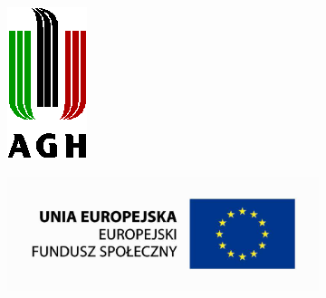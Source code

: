 \documentclass[9pt]{beamer}
\begin{document}
\begin{frame}
\begin{figure}[h!]
\begin{subfigure}[b]{0.06\textwidth}
		\includegraphics[width=\textwidth, keepaspectratio=true]{img/agh.png}
	\end{subfigure}
	\qquad
	\begin{subfigure}[b]{0.3\textwidth}
		\includegraphics[width=\textwidth, keepaspectratio=true]{img/ue.png}
	\end{subfigure}
\end{figure}
\end{frame}
\end{document}
